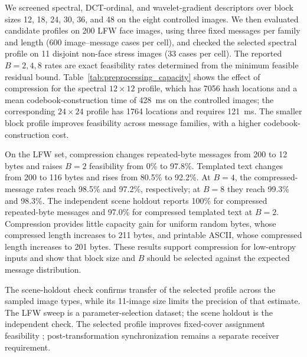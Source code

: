 \documentclass[preprint,12pt]{elsarticle}
\theoremstyle{plain}
\providecommand{\DIFaddtex}[1]{{\protect\color{blue} \sf #1}} %
\providecommand{\DIFdeltex}[1]{{\protect\color{red} \scriptsize #1}} %
\providecommand{\DIFaddbegin}{} %
\providecommand{\DIFaddend}{} %
\providecommand{\DIFdelbegin}{} %
\providecommand{\DIFdelend}{} %
\providecommand{\DIFadd}[1]{\texorpdfstring{\DIFaddtex{#1}}{#1}} %
\providecommand{\DIFdel}[1]{\texorpdfstring{\DIFdeltex{#1}}{}} %
\providecommand{\DIFscaledelfig}{0.5}
\newlength{\DIFdelgraphicswidth} %
\newlength{\DIFdelgraphicsheight} %
\providecommand{\DIFaddincludegraphics}[2][]{{\color{blue}\fbox{\DIFOincludegraphics[#1]{#2}}}} %
\providecommand{\DIFdelincludegraphics}[2][]{%
\sbox{\DIFdelgraphicsbox}{\DIFOincludegraphics[#1]{#2}}%
\settoboxwidth{\DIFdelgraphicswidth}{\DIFdelgraphicsbox} %
\settoboxtotalheight{\DIFdelgraphicsheight}{\DIFdelgraphicsbox} %
\scalebox{\DIFscaledelfig}{%
\parbox[b]{\DIFdelgraphicswidth}{\usebox{\DIFdelgraphicsbox}\\[-\baselineskip] \rule{\DIFdelgraphicswidth}{0em}}\llap{\resizebox{\DIFdelgraphicswidth}{\DIFdelgraphicsheight}{%
\setlength{\unitlength}{\DIFdelgraphicswidth}%
\begin{picture}(1,1)%
\thicklines\linethickness{2pt} %
{\color[rgb]{1,0,0}\put(0,0){\framebox(1,1){}}}%
{\color[rgb]{1,0,0}\put(0,0){\line( 1,1){1}}}%
{\color[rgb]{1,0,0}\put(0,1){\line(1,-1){1}}}%
\end{picture}%
}\hspace*{3pt}}} %
} %
\DeclareRobustCommand{\DIFaddbegin}{\DIFOaddbegin \let\includegraphics\DIFaddincludegraphics} %
\DeclareRobustCommand{\DIFaddend}{\DIFOaddend \let\includegraphics\DIFOincludegraphics} %
\DeclareRobustCommand{\DIFdelbegin}{\DIFOdelbegin \let\includegraphics\DIFdelincludegraphics} %
\DeclareRobustCommand{\DIFdelend}{\DIFOaddend \let\includegraphics\DIFOincludegraphics} %
\renewcommand{\DIFdel}[1]{}
\renewcommand{\DIFdelincludegraphics}[2][]{}
\begin{document}
We screened spectral, DCT-ordinal, and wavelet-gradient descriptors over block
sizes 12, 18, 24, 30, 36, and 48 on the eight controlled images. We then
evaluated candidate profiles on 200 LFW face images, using three fixed messages
per family and length (600 image--message cases per cell), and checked the
selected spectral profile on 11 disjoint non-face stress images (33 cases per
cell). The reported $B=2,4,8$ rates are exact feasibility rates determined from
the minimum feasible residual bound. Table~\ref{tab:preprocessing_capacity}
shows the effect of compression for the spectral $12\times12$ profile, which
has 7056 hash locations and a mean codebook-construction time of 428~ms on the
controlled images; the corresponding $24\times24$ profile has 1764 locations
and requires 121~ms. The smaller block profile improves feasibility across
message families, with a higher codebook-construction cost.

On the LFW set, compression changes repeated-byte messages from 200 to 12
bytes and raises $B=2$ feasibility from 0\% to 97.8\%. Templated text changes
from 200 to 116 bytes and rises from 80.5\% to 92.2\%. At $B=4$, the
compressed-message rates reach 98.5\% and 97.2\%, respectively; at $B=8$ they
reach 99.3\% and 98.3\%. The independent scene holdout reports 100\% for
compressed repeated-byte messages and 97.0\% for compressed templated text at
$B=2$. Compression provides little capacity gain for uniform random bytes,
whose compressed length increases to 211 bytes, and printable ASCII, whose
compressed length increases to 201 bytes. These results support compression
for low-entropy inputs and show that block size and $B$ should be selected
against the expected message distribution.

\begin{table}[!t]
\centering
\small
\caption{Lossless Preprocessing and Assignment Feasibility at 200 Source Bytes}
\label{tab:preprocessing_capacity}
\resizebox{\linewidth}{!}{}
\end{table}

The scene-holdout check confirms transfer of the selected profile across the
sampled image types, while its 11-image size limits the precision of that
estimate. The LFW sweep is a parameter-selection dataset; the scene holdout is
the independent check. The selected profile improves fixed-cover assignment
feasibility\DIFdelbegin \DIFdel{and does not alter }\DIFdelend \DIFaddbegin \DIFadd{; }\DIFaddend post-transformation synchronization \DIFaddbegin \DIFadd{remains a separate receiver
requirement}\DIFaddend .
\end{document}
